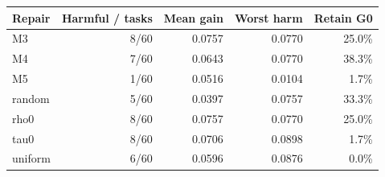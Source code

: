 \begin{tabular}{lrrrr}
\hline
Repair & Harmful / tasks & Mean gain & Worst harm & Retain G0 \\
\hline
M3 & 8/60 & 0.0757 & 0.0770 & 25.0\% \\
M4 & 7/60 & 0.0643 & 0.0770 & 38.3\% \\
M5 & 1/60 & 0.0516 & 0.0104 & 1.7\% \\
random & 5/60 & 0.0397 & 0.0757 & 33.3\% \\
rho0 & 8/60 & 0.0757 & 0.0770 & 25.0\% \\
tau0 & 8/60 & 0.0706 & 0.0898 & 1.7\% \\
uniform & 6/60 & 0.0596 & 0.0876 & 0.0\% \\
\hline
\end{tabular}
